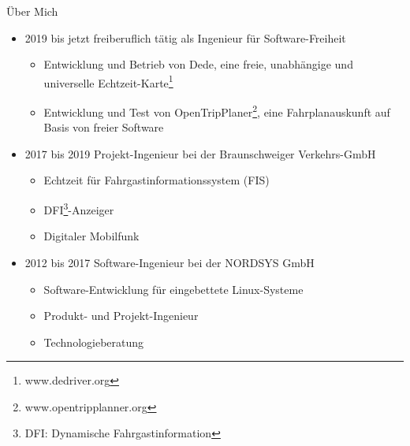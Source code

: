 
\begin{frame}{Über Mich}
  \begin{itemize}
  \item<1-1> 2019 bis jetzt freiberuflich tätig als Ingenieur für Software-Freiheit
    \begin{itemize}
    \item<1-1> Entwicklung und Betrieb von Dede, eine freie, unabhängige und universelle Echtzeit-Karte\footnote{www.dedriver.org}
    \item<1-1> Entwicklung und Test von OpenTripPlaner\footnote{www.opentripplanner.org}, eine Fahrplanauskunft auf Basis von freier Software
    \end{itemize}
  \item<2-2> 2017 bis 2019 Projekt-Ingenieur bei der Braunschweiger Verkehrs-GmbH
    \begin{itemize}
    \item<2-2> Echtzeit für Fahrgastinformationssystem (FIS)
    \item<2-2> DFI\footnote{DFI: Dynamische Fahrgastinformation}-Anzeiger
    \item<2-2> Digitaler Mobilfunk
    \end{itemize}
  \item<3-3> 2012 bis 2017 Software-Ingenieur bei der NORDSYS GmbH
    \begin{itemize}
    \item<3-3> Software-Entwicklung für eingebettete Linux-Systeme
    \item<3-3> Produkt- und Projekt-Ingenieur
    \item<3-3> Technologieberatung
    \end{itemize}
  \end{itemize}
\end{frame}
